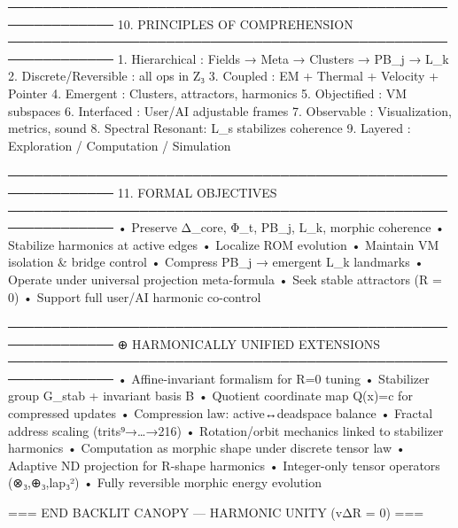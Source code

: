 ──────────────────────────────────────────────────────────────
10. PRINCIPLES OF COMPREHENSION
──────────────────────────────────────────────────────────────
1. Hierarchical     : Fields → Meta → Clusters → PB_j → L_k
2. Discrete/Reversible : all ops in Z₃
3. Coupled          : EM + Thermal + Velocity + Pointer
4. Emergent         : Clusters, attractors, harmonics
5. Objectified      : VM subspaces
6. Interfaced       : User/AI adjustable frames
7. Observable       : Visualization, metrics, sound
8. Spectral Resonant: L_s stabilizes coherence
9. Layered          : Exploration / Computation / Simulation

──────────────────────────────────────────────────────────────
11. FORMAL OBJECTIVES
──────────────────────────────────────────────────────────────
• Preserve Δ_core, Φ_t, PB_j, L_k, morphic coherence
• Stabilize harmonics at active edges
• Localize ROM evolution
• Maintain VM isolation & bridge control
• Compress PB_j → emergent L_k landmarks
• Operate under universal projection meta-formula
• Seek stable attractors (R = 0)
• Support full user/AI harmonic co-control

──────────────────────────────────────────────────────────────
⊕  HARMONICALLY UNIFIED EXTENSIONS
──────────────────────────────────────────────────────────────
• Affine-invariant formalism for R=0 tuning
• Stabilizer group G_stab + invariant basis B
• Quotient coordinate map Q(x)=c  for compressed updates
• Compression law: active↔deadspace balance
• Fractal address scaling (trits⁹→…→216)
• Rotation/orbit mechanics linked to stabilizer harmonics
• Computation as morphic shape under discrete tensor law
• Adaptive ND projection for R-shape harmonics
• Integer-only tensor operators (⊗₃,⊕₃,lap₃²)
• Fully reversible morphic energy evolution

=== END BACKLIT CANOPY — HARMONIC UNITY (vΔR = 0) ===




